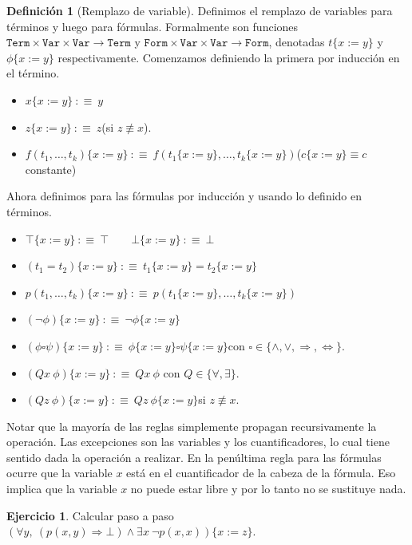 \documentclass[a4paper, 12pt]{report}
\newcommand{\Ra}{\Rightarrow}
\newcommand{\Lra}{\Leftrightarrow}
\theoremstyle{definition}
\newtheorem{definicion}[teorema]{Definición}
\newtheorem{ejercicio}{Ejercicio}[section]
\begin{document}
\begin{definicion}[Remplazo de variable]
	Definimos el remplazo de variables para términos y luego para fórmulas. Formalmente son funciones $\mathtt{Term}\times\mathtt{Var}\times\mathtt{Var}\to\mathtt{Term}$ y $\mathtt{Form}\times\mathtt{Var}\times\mathtt{Var}\to\mathtt{Form}$, denotadas $t\{x:=y\}$ y $\phi\{x:=y\}$ respectivamente. Comenzamos definiendo la primera por inducción en el término.
	\begin{itemize}
		\item $x\{x:=y\} ~:\equiv~ y$
		\item $z\{x:=y\} ~:\equiv~ z$\quad(si $z\not\equiv x$).
		\item $f(t_1,\dots,t_k)\{x:=y\}~:\equiv~f(t_1\{x:=y\},\dots,t_k\{x:=y\})$\quad ($c\{x:=y\}\equiv c$ constante)
	\end{itemize}
	Ahora definimos para las fórmulas por inducción y usando lo definido en términos.
	\begin{itemize}
		\item $\top\{x:=y\}~:\equiv~\top\qquad \bot\{x:=y\}~:\equiv~\bot$
		\item $(t_1=t_2)\{x:=y\}~:\equiv~ t_1\{x:=y\}=t_2\{x:=y\}$
		\item $p(t_1,\dots,t_k)\{x:=y\}~:\equiv~p(t_1\{x:=y\},\dots,t_k\{x:=y\})$
		\item $(\lnot\phi)\{x:=y\}~:\equiv~\lnot\phi\{x:=y\}$
		\item $(\phi\square\psi)\{x:=y\}~:\equiv~\phi\{x:=y\}\square\psi\{x:=y\}$\quad con $\square\in\{\wedge,\vee,\Ra,\Lra\}$.
		\item $(Qx~\phi)\{x:=y\}~:\equiv~Qx~\phi$ \quad con $Q\in\{\forall,\exists\}$.
		\item $(Qz~\phi)\{x:=y\}~:\equiv~Qz~\phi\{x:=y\}$\quad si $z\not\equiv x$.
	\end{itemize}
\end{definicion}
Notar que la mayoría de las reglas simplemente propagan recursivamente la operación. Las excepciones son las variables y los cuantificadores, lo cual tiene sentido dada la operación a realizar. En la penúltima regla para las fórmulas ocurre que la variable $x$ está en el cuantificador de la cabeza de la fórmula. Eso implica que la variable $x$ no puede estar libre y por lo tanto no se sustituye nada.

\begin{ejercicio}
	Calcular paso a paso $(\forall y,~(p(x,y)\Ra\bot)\wedge\exists x~\lnot p(x,x))\{x:=z\}$.
\end{ejercicio}
\end{document}
